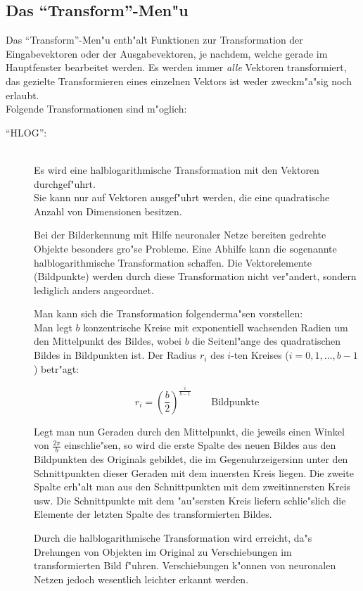 \subsection{Das "`Transform"'-Men"u}

Das "`Transform"'-Men"u enth"alt Funktionen zur Transformation der
Eingabevektoren oder der Ausgabevektoren, je nachdem, welche gerade
im Hauptfenster bearbeitet werden.
Es werden immer {\sl alle} Vektoren transformiert, das gezielte
Transformieren eines einzelnen Vektors ist weder zweckm"a"sig noch erlaubt. \\ 
Folgende Transformationen sind m"oglich:

\begin{description}
\item["`HLOG"':] \mbox{} \\
Es wird eine halblogarithmische 
Transformation mit den Vektoren durchgef"uhrt. \\
Sie kann nur auf Vektoren ausgef"uhrt werden, die eine quadratische
Anzahl von Dimensionen besitzen. 

Bei der Bilderkennung mit Hilfe neuronaler Netze bereiten gedrehte Objekte
besonders gro"se Probleme.
Eine Abhilfe kann die sogenannte halblogarithmische Transformation 
schaffen.
Die Vektorelemente (Bildpunkte) werden durch diese Transformation nicht
ver"andert, sondern lediglich anders angeordnet.

Man kann sich die Transformation folgenderma"sen vorstellen: \\
Man legt $b$ konzentrische Kreise mit exponentiell wachsenden Radien um den
Mittelpunkt des Bildes, wobei $b$ die Seitenl"ange des quadratischen Bildes 
in Bildpunkten ist.
Der Radius $r_i$ des $i$-ten Kreises ($i=0,1,\ldots,b-1$) betr"agt:

\[ r_i = \left( \frac{b}{2}\right)^{\frac{i}{b-1}} \qquad \mbox{Bildpunkte} \] 

Legt man nun Geraden durch den Mittelpunkt, die jeweils einen Winkel
von $\frac{2\pi}{b}$ ein\-schlie"sen, so wird die erste Spalte des neuen
Bildes aus den Bildpunkten des Originals gebildet, die im 
Gegenuhrzeigersinn unter den Schnittpunkten dieser Geraden mit dem innersten
Kreis liegen.
Die zweite Spalte erh"alt man aus den Schnittpunkten mit dem zweitinnersten 
Kreis usw.
Die Schnittpunkte mit dem "au"sersten Kreis liefern schlie"slich die Elemente 
der letzten Spalte des transformierten Bildes. 

Durch die halblogarithmische Transformation wird erreicht, da"s
Drehungen von Objekten im Original   
zu Verschiebungen im transformierten Bild f"uhren.
Verschiebungen k"onnen von neuronalen Netzen jedoch wesentlich leichter
erkannt werden.


\end{description}
